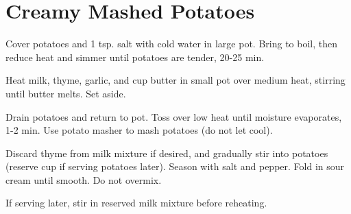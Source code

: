 \section{Creamy Mashed Potatoes}
\begin{recipe}
	
	
	
	Cover potatoes and 1 tsp. salt with cold water in large pot. Bring to boil, then reduce heat and simmer until potatoes are tender, 20-25 min.
	
	Heat milk, thyme, garlic, and  cup butter in small pot over medium heat, stirring until butter melts. Set aside.
	
	Drain potatoes and return to pot. Toss over low heat until moisture evaporates, 1-2 min. Use potato masher to mash potatoes (do not let cool).
	
	Discard thyme from milk mixture if desired, and gradually stir into potatoes (reserve  cup if serving potatoes later). Season with salt and pepper. Fold in sour cream until smooth. Do not overmix.
	
	If serving later, stir in reserved milk mixture before reheating.
\end{recipe}
